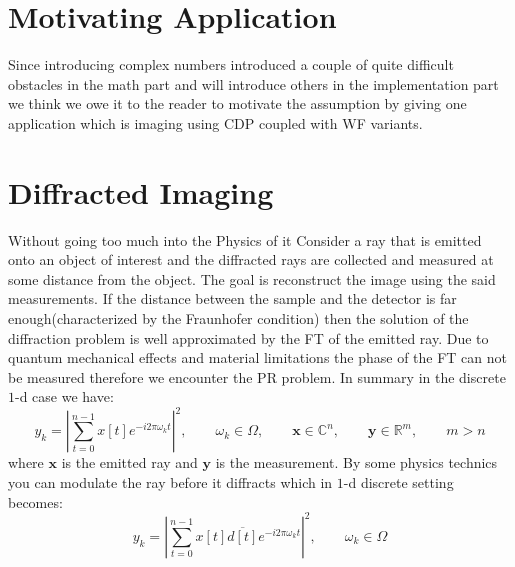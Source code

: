 \section{Motivating Application}

Since introducing complex numbers introduced a couple of quite difficult obstacles in the math part and will introduce others in the implementation part 
we think we owe it to the reader to motivate the assumption by giving one application which is imaging using \ac{CDP} coupled with \ac{WF} variants.

\section{Diffracted Imaging}\label{sec:diffracted_imaging}

Without going too much into the Physics of it Consider a ray that is emitted onto an object of interest and the diffracted rays are collected and measured at some distance from the object. 
The goal is reconstruct the image using the said measurements. If the distance between the sample and the detector is far enough(characterized by the Fraunhofer condition\cite{Lipson1995}) 
then the solution of the diffraction problem is well approximated by the \ac{FT} of the emitted ray. Due to quantum mechanical effects and material limitations\cite{Shechtman2015}\cite{DGDS2018}\cite{FranzSchwabl2007} 
the phase of the \ac{FT} can not be measured therefore we encounter the \ac{PR} problem. In summary in the discrete $1$-d case we have:
\begin{equation}
	y_k = \left| \sum_{t=0}^{n-1} x[t] e^{-i2\pi\omega_kt} \right|^2 , \qquad \omega_k \in \Omega, \qquad \boldsymbol{x} \in \mathbb{C}^n , \qquad \boldsymbol{y} \in \mathbb{R}^m, \qquad m > n 
\end{equation}
where $\boldsymbol{x}$ is the emitted ray and $\boldsymbol{y}$ is the measurement. By some physics technics\cite{Loewen2018}\cite{Candes2011} you can modulate 
the ray before it diffracts which in $1$-d discrete setting becomes:
\begin{equation}\label{eq:modulation_effect}
	y_k = \left| \sum_{t=0}^{n-1} x[t]\overline{d[t]} e^{-i2\pi\omega_kt} \right|^2 , \qquad \omega_k \in \Omega
\end{equation}

